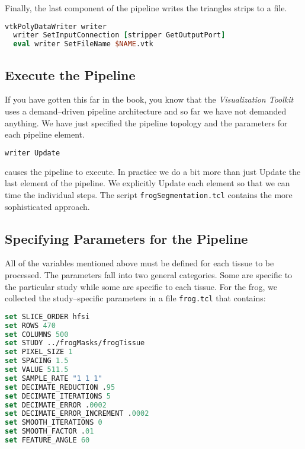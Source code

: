 Finally, the last component of the pipeline writes the triangles strips to a file.

\begin{lstlisting}[language=TCL, caption={Write the Triangles to a File.}]
vtkPolyDataWriter writer
  writer SetInputConnection [stripper GetOutputPort]
  eval writer SetFileName $NAME.vtk
\end{lstlisting}

\subsection{Execute the Pipeline}

If you have gotten this far in the book, you know that the \emph{Visualization Toolkit} uses a demand--driven pipeline architecture and so far we have not demanded anything. We have just specified the pipeline topology and the parameters for each pipeline element.

\begin{lstlisting}[language=TCL, caption={}, numbers=none, frame=none]
writer Update
\end{lstlisting}

causes the pipeline to execute. In practice we do a bit more than just Update the last element of the pipeline. We explicitly Update each element so that we can time the individual steps. The script \texttt{frogSegmentation.tcl} contains the more sophisticated approach.

\subsection{Specifying Parameters for the Pipeline}

All of the variables mentioned above must be defined for each tissue
to be processed. The parameters fall into two general categories. Some are specific to the particular study while some are specific to each tissue. For the frog, we collected the study--specific parameters in a file \texttt{frog.tcl} that contains:

\begin{lstlisting}[language=TCL, caption={Specifying Parameters for the Pipeline.}]
set SLICE_ORDER hfsi
set ROWS 470
set COLUMNS 500
set STUDY ../frogMasks/frogTissue
set PIXEL_SIZE 1
set SPACING 1.5
set VALUE 511.5
set SAMPLE_RATE "1 1 1"
set DECIMATE_REDUCTION .95
set DECIMATE_ITERATIONS 5
set DECIMATE_ERROR .0002
set DECIMATE_ERROR_INCREMENT .0002
set SMOOTH_ITERATIONS 0
set SMOOTH_FACTOR .01
set FEATURE_ANGLE 60
\end{lstlisting}

